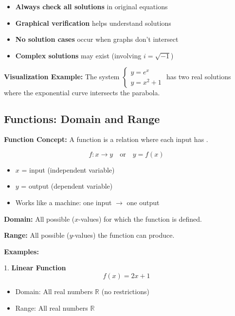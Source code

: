 \documentclass{article} %
\begin{document}
\begin{itemize}
    \item \textbf{Always check all solutions} in original equations
    \item \textbf{Graphical verification} helps understand solutions
    \item \textbf{No solution cases} occur when graphs don't intersect
    \item \textbf{Complex solutions} may exist (involving $i=\sqrt{-1}$)
\end{itemize}

\textbf{Visualization Example:}
The system $\begin{cases}y = e^x \\ y = x^2 + 1\end{cases}$ has two real solutions where the exponential curve intersects the parabola.

\subsection{Functions: Domain and Range}

\textbf{Function Concept:}
A function is a relation where each input has . 

\[
f: x \rightarrow y \quad \text{or} \quad y = f(x)
\]

\begin{itemize}
    \item $x$ = input (independent variable)
    \item $y$ = output (dependent variable)
    \item Works like a machine: one input $\rightarrow$ one output
\end{itemize}

\textbf{Domain:}
All possible  ($x$-values) for which the function is defined.

\textbf{Range:} 
All possible  ($y$-values) the function can produce.

\textbf{Examples:}

1. \textbf{Linear Function}
\[
f(x) = 2x + 1
\]
\begin{itemize}
    \item Domain: All real numbers $\mathbb{R}$ (no restrictions)
    \item Range: All real numbers $\mathbb{R}$
\end{itemize}
\end{document}
